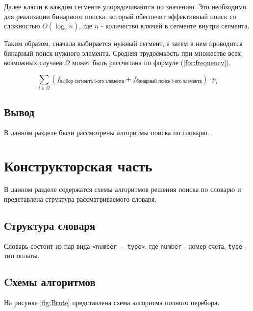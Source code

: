 \documentclass[12pt]{report}
\begin{document}
Далее ключи в каждом сегменте упорядочиваются по значению. Это необходимо для реализации бинарного поиска, который обеспечит эффективный поиск со сложностью $O(\log_2n)$, где $n$ - количество ключей в сегменте внутри сегмента.

Таким образом, сначала выбирается нужный сегмент, а затем в нем проводится бинарный поиск нужного элемента. Средняя трудоёмкость при множестве всех возможных случаев $\Omega$ может быть рассчитана по формуле (\ref{for:frequency}). 

\begin{equation}
	\label{for:frequency}
	\sum_{i \in \Omega}{\left(f_{\text{выбор сегмента i-ого элемента}} + f_{\text{бинарный поиск i-ого элемента}}\right)} \cdot p_i
\end{equation}


\section{Вывод}
В данном разделе были рассмотрены алгоритмы поиска по словарю.


\chapter{Конструкторская часть}
В данном разделе содержатся схемы алгоритмов решения поиска по словарю и представлена структура рассматриваемого словаря.

\section{Структура словаря}

Словарь состоит из пар вида \texttt{<number - type>}, где \texttt{number} - номер счета, \texttt{type} - тип оплаты.

\section{Cхемы алгоритмов}

На рисунке \ref{fig:Brute} представлена схема алгоритма полного перебора.
\end{document}
